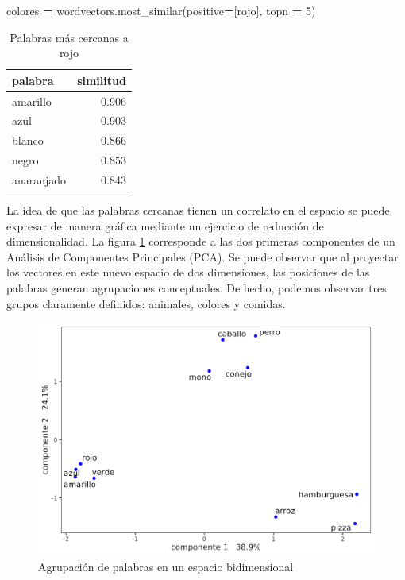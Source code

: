 \documentclass[
  12pt,
]{article}
\newenvironment{Shaded}{\begin{snugshade}}{\end{snugshade}}
\newcommand{\DecValTok}[1]{\textcolor[rgb]{0.00,0.00,0.81}{#1}}
\newcommand{\NormalTok}[1]{#1}
\newcommand{\OperatorTok}[1]{\textcolor[rgb]{0.81,0.36,0.00}{\textbf{#1}}}
\newcommand{\StringTok}[1]{\textcolor[rgb]{0.31,0.60,0.02}{#1}}
\begin{document}
\begin{Shaded}
\begin{Highlighting}[]
\NormalTok{colores }\OperatorTok{=}\NormalTok{  wordvectors.most\_similar(positive}\OperatorTok{=}\NormalTok{[}\StringTok{\textquotesingle{}rojo\textquotesingle{}}\NormalTok{],  topn }\OperatorTok{=} \DecValTok{5}\NormalTok{)}
\end{Highlighting}
\end{Shaded}

\begin{table}[H]

\caption{\label{tab:tabla_colores}Palabras más cercanas a rojo}
\centering
\begin{tabular}[t]{lr}
\toprule
palabra & similitud\\
\midrule
amarillo & 0.906\\
azul & 0.903\\
blanco & 0.866\\
negro & 0.853\\
anaranjado & 0.843\\
\bottomrule
\end{tabular}
\end{table}

La idea de que las palabras cercanas tienen un correlato en el espacio
se puede expresar de manera gráfica mediante un ejercicio de reducción
de dimensionalidad. La figura \ref{plot_pca_ejemplo} corresponde a las
dos primeras componentes de un Análisis de Componentes Principales
(PCA). Se puede observar que al proyectar los vectores en este nuevo
espacio de dos dimensiones, las posiciones de las palabras generan
agrupaciones conceptuales. De hecho, podemos observar tres grupos
claramente definidos: animales, colores y comidas.

\begin{figure}[H]
\centering
\large
\caption{Agrupación de palabras en un espacio bidimensional}
\label{plot_pca_ejemplo}
\includegraphics[width = 0.5 \textwidth]{cuadros_tesis/plot_pca.png}
\normalsize
\end{figure}
\end{document}
